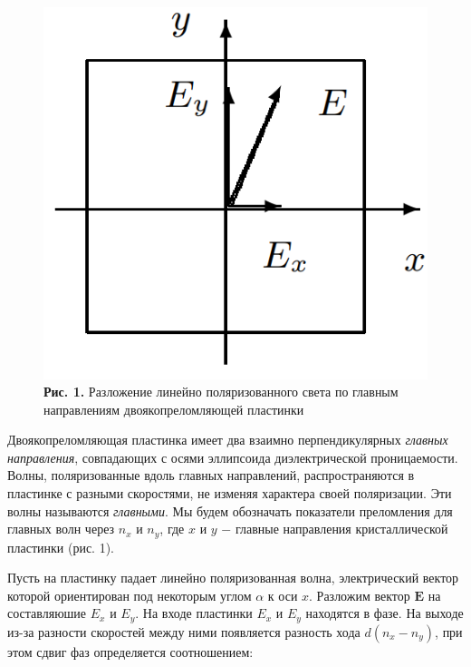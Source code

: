 \documentclass[a4paper,12pt]{article} %
\begin{document}
\begin{figure}
\begin{center}
    \includegraphics[width=1\textwidth]{4.7.3_1.png}
    \textbf{Рис. 1.} Разложение линейно поляризованного света по главным направлениям двоякопреломляющей пластинки
\end{center}
\end{figure}

\hfill \break Двоякопреломляющая пластинка имеет два взаимно перпендикулярных \textit{главных направления}, совпадающих с осями эллипсоида диэлектрической проницаемости. Волны, поляризованные вдоль главных направлений, распространяются в пластинке с разными скоростями, не изменяя характера своей поляризации. Эти волны называются \textit{главными}. Мы будем обозначать показатели преломления для главных волн через $n_{x}$ и $n_{y}$, где $x$ и $y$ $-$ главные направления кристаллической пластинки (рис. 1). 

\hfill \break Пусть на пластинку падает линейно поляризованная волна, электрический вектор которой ориентирован под некоторым углом $\alpha$ к оси $x$. Разложим вектор $\boldsymbol{E}$ на составляюшие $E_{x}$ и $E_{y}$. На входе пластинки $E_{x}$ и $E_{y}$ находятся в фазе. На выходе из-за разности скоростей между ними появляется разность хода $d(n_{x}-n_{y})$, при этом сдвиг фаз определяется соотношением:
\end{document}
